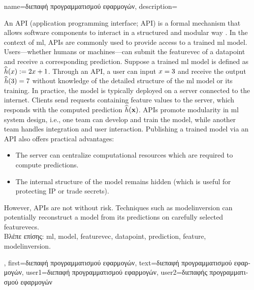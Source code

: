 {name={\foreignlanguage{greek}{διεπαφή προγραμματισμού εφαρμογών}},
		description={
			An  API (application programming interface; API) is a formal mechanism that 
			allows software components to interact in a structured and modular way \cite{RestfulBook2013}.
			In the context of \gls{ml}, APIs are commonly used to provide access to a trained \gls{ml} \gls{model}. 
			Users—whether humans or machines—can submit the \gls{featurevec} of a \gls{datapoint} and receive 
			a corresponding \gls{prediction}. Suppose a trained \gls{ml} \gls{model} is defined 
			as $\widehat{h}(x) := 2 x + 1$. Through an API, a user 
			can input $x = 3$ and receive the output $\widehat{h}(3) = 7$ 
			without knowledge of the detailed structure of the \gls{ml} \gls{model} or its training. 
			In practice, the \gls{model} is typically deployed on a server connected to the internet. 
			Clients send requests containing \gls{feature} values to the server, which responds with 
			the computed \gls{prediction} $\widehat{h}({\bf x})$. APIs promote modularity 
			in \gls{ml} system design, i.e., one team can develop and train the model, while another team
			handles integration and user interaction. Publishing a trained \gls{model} via an API also 
			offers practical advantages: 
			\begin{itemize} 
				\item The server can centralize computational resources which are required to compute \gls{prediction}s. 
		        \item The internal structure of the \gls{model} remains hidden (which is useful for protecting IP or trade secrets). 
		    \end{itemize} 
			However, APIs are not without \gls{risk}. Techniques such as \gls{modelinversion} can potentially reconstruct a 
			\gls{model} from its \gls{prediction}s on carefully selected \gls{featurevec}s.\\
			\foreignlanguage{greek}{Βλέπε επίσης:} \gls{ml}, \gls{model}, \gls{featurevec}, \gls{datapoint}, \gls{prediction}, \gls{feature}, \gls{modelinversion}.
			},
		first={\foreignlanguage{greek}{διεπαφή προγραμματισμού εφαρμογών}},
		text={\foreignlanguage{greek}{διεπαφή προγραμματισμού εφαρμογών}},
		user1={\foreignlanguage{greek}{διεπαφή προγραμματισμού εφαρμογών}}, %
		user2={\foreignlanguage{greek}{διεπαφής προγραμματισμού εφαρμογών}} %
}

